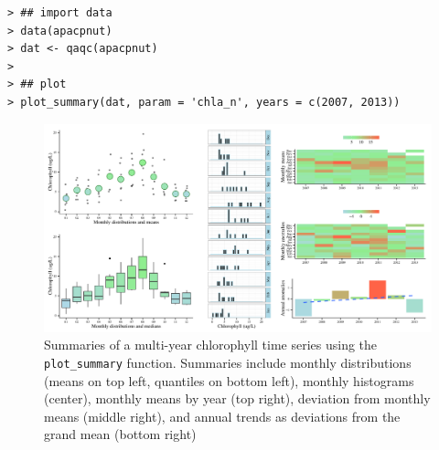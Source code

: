 \documentclass[10pt,letterpaper]{article}\usepackage[]{graphicx}\usepackage[]{color}
\makeatletter
\def\maxwidth{ %
  \ifdim\Gin@nat@width>\linewidth
    \linewidth
  \else
    \Gin@nat@width
  \fi
}
\newenvironment{kframe}{%
 \def\at@end@of@kframe{}%
 \ifinner\ifhmode%
  \def\at@end@of@kframe{\end{minipage}}%
  \begin{minipage}{\columnwidth}%
 \fi\fi%
 \def\FrameCommand##1{\hskip\@totalleftmargin \hskip-\fboxsep
 \colorbox{shadecolor}{##1}\hskip-\fboxsep
     \hskip-\linewidth \hskip-\@totalleftmargin \hskip\columnwidth}%
 \MakeFramed {\advance\hsize-\width
   \@totalleftmargin\z@ \linewidth\hsize
   \@setminipage}}%
 {\par\unskip\endMakeFramed%
 \at@end@of@kframe}
\newenvironment{knitrout}{}{} %
\makeatother
\begin{document}
\begin{knitrout}
\color{fgcolor}\begin{kframe}
\begin{verbatim}
> ## import data
> data(apacpnut)
> dat <- qaqc(apacpnut)
> 
> ## plot
> plot_summary(dat, param = 'chla_n', years = c(2007, 2013))
\end{verbatim}
\end{kframe}\begin{figure}[!ht]


{\centering \includegraphics[width=\maxwidth]{figure/summary_ex} 

}

\caption[Summaries of a multi-year chlorophyll time series using the \texttt{plot\_summary} function]{Summaries of a multi-year chlorophyll time series using the \texttt{plot\_summary} function.  Summaries include monthly distributions (means on top left, quantiles on bottom left), monthly histograms (center), monthly means by year (top right), deviation from monthly means (middle right), and annual trends as deviations from the grand mean (bottom right)\label{fig:summary_ex}}
\end{figure}


\end{knitrout}
\end{document}
